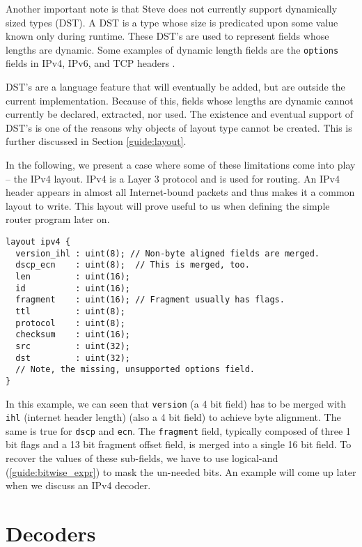 Another important note is that Steve does not currently support dynamically
sized types (DST). A DST is a type whose size is predicated upon some value
known only during runtime. These DST's are used to represent fields whose
lengths are dynamic. Some examples of dynamic length fields are the
\texttt{options} fields in IPv4, IPv6, and TCP headers \cite{ipv4_std, ipv6_std,
tcp_std}.

DST's are a language feature that will eventually be added, but are outside the
current implementation. Because of this, fields whose lengths are dynamic cannot
currently be declared, extracted, nor used. The existence and eventual support
of DST's is one of the reasons why objects of layout type cannot be created.
This is further discussed in Section \ref{guide:layout}.

In the following, we present a case where some of these limitations come into
play -- the IPv4 layout. IPv4 is a Layer 3 protocol \cite{osi_model} and is used
for routing. An IPv4 header appears in almost all Internet-bound packets and
thus makes it a common layout to write. This layout will prove useful to us when
defining the simple router program later on.

\begin{codepage}
\begin{lstlisting}
layout ipv4 {
  version_ihl : uint(8); // Non-byte aligned fields are merged.
  dscp_ecn    : uint(8);  // This is merged, too.
  len         : uint(16);
  id          : uint(16);
  fragment    : uint(16); // Fragment usually has flags.
  ttl         : uint(8);
  protocol    : uint(8);
  checksum    : uint(16);
  src         : uint(32);
  dst         : uint(32);
  // Note, the missing, unsupported options field.
}
\end{lstlisting}
\end{codepage}

In this example, we can seen that \texttt{version} (a 4 bit field) has to be
merged with \texttt{ihl} (internet header length) (also a 4 bit field) to
achieve byte alignment. The same is true for \texttt{dscp} and \texttt{ecn}. The
\texttt{fragment} field, typically composed of three 1 bit flags and a 13 bit
fragment offset field, is merged into a single 16 bit field. To recover the
values of these sub-fields, we have to use logical-and
(\ref{guide:bitwise_expr}) to mask the un-needed bits. An example will come up
later when we discuss an IPv4 decoder.

\section{Decoders} \label{tut:decoder}

